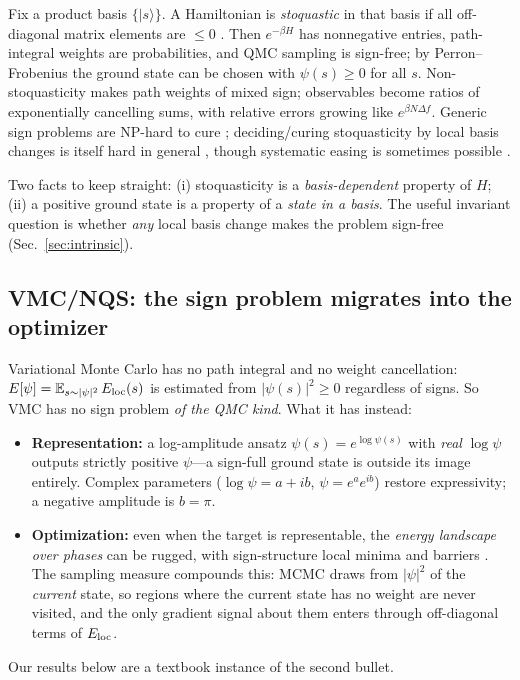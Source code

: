 \documentclass[11pt]{article}
\newcommand{\ket}[1]{|#1\rangle}
\begin{document}
Fix a product basis $\{\ket{s}\}$. A Hamiltonian is \emph{stoquastic} in that
basis if all off-diagonal matrix elements are $\le 0$
\cite{BravyiDiVincenzoOliveiraTerhal2008}. Then $e^{-\beta H}$ has nonnegative
entries, path-integral weights are probabilities, and QMC sampling is
sign-free; by Perron--Frobenius the ground state can be chosen with
$\psi(s)\ge 0$ for all $s$. Non-stoquasticity makes path weights of mixed sign;
observables become ratios of exponentially cancelling sums, with relative
errors growing like $e^{\beta N \Delta f}$. Generic sign problems are
NP-hard to cure \cite{TroyerWiese2005}; deciding/curing stoquasticity by local
basis changes is itself hard in general
\cite{MarvianLidarHen2019,KlassenTerhal2019}, though systematic easing is
sometimes possible \cite{Hangleiter2020}.

Two facts to keep straight:
(i) stoquasticity is a \emph{basis-dependent} property of $H$;
(ii) a positive ground state is a property of a \emph{state in a basis}. The
useful invariant question is whether \emph{any} local basis change makes the
problem sign-free (Sec.~\ref{sec:intrinsic}).

\subsection{VMC/NQS: the sign problem migrates into the optimizer}

Variational Monte Carlo has no path integral and no weight cancellation:
$E[\psi]=\mathbb{E}_{s\sim|\psi|^2}\,E_{\rm loc}(s)$ is estimated from
$|\psi(s)|^2\ge0$ regardless of signs. So VMC has no sign problem \emph{of the
QMC kind}. What it has instead:
\begin{itemize}
\item \textbf{Representation:} a log-amplitude ansatz
$\psi(s)=e^{\log\psi(s)}$ with \emph{real} $\log\psi$ outputs strictly
positive $\psi$---a sign-full ground state is outside its image entirely.
Complex parameters ($\log\psi=a+ib$, $\psi=e^a e^{ib}$) restore expressivity;
a negative amplitude is $b=\pi$.
\item \textbf{Optimization:} even when the target is representable, the
\emph{energy landscape over phases} can be rugged, with sign-structure local
minima and barriers \cite{SzaboCastelnovo2020,Bukov2021,Westerhout2020}. The
sampling measure compounds this: MCMC draws from $|\psi|^2$ of the
\emph{current} state, so regions where the current state has no weight are
never visited, and the only gradient signal about them enters through
off-diagonal terms of $E_{\rm loc}$.
\end{itemize}
Our results below are a textbook instance of the second bullet.
\end{document}
